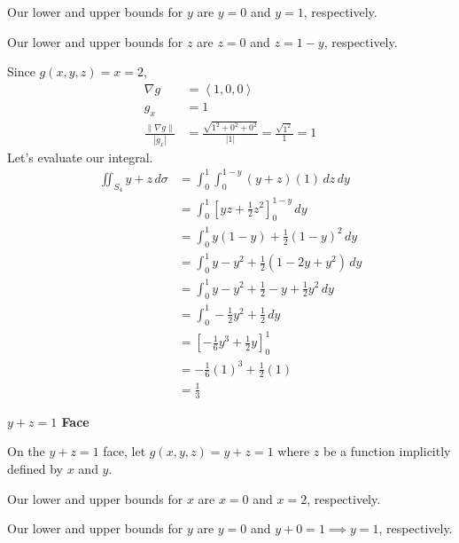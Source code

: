 \documentclass{article}
\newcommand{\lrp}[1]{\left( #1 \right)}
\newcommand{\lra}[1]{\left\langle #1 \right\rangle}
\newcommand{\lrb}[1]{\left[ #1 \right]}
\newcommand{\norm}[1]{\left\lVert #1 \right\rVert}
\begin{document}
Our lower and upper bounds for $y$ are $y=0$ and $y=1$, respectively.

Our lower and upper bounds for $z$ are $z=0$ and $z=1-y$, respectively.

Since $g(x,y,z)=x=2$,
\begin{align*}
    \nabla g &=\lra{1,0,0}\\
    g_x&=1\\
    \frac{\norm{\nabla g}}{\left|g_x\right|}&=\frac{\sqrt{1^2+0^2+0^2}}{\left|1\right|}=\frac{\sqrt{1^2}}{1}=1
\end{align*}
Let's evaluate our integral.
\begin{align*}
      \iint_{S_4} y+z\,d\sigma&=\int_0^1\int_0^{1-y}\lrp{y+z}\lrp{1}\,dz\,dy\\
    &=\int_0^1\lrb{yz+\frac{1}{2}z^2}_0^{1-y}\,dy\\
    &=\int_0^1 y(1-y)+\frac{1}{2}(1-y)^2\,dy\\
    &=\int_0^1 y-y^2 +\frac{1}{2}\lrp{1-2y+y^2}\,dy\\
    &=\int_0^1 y-y^2+\frac{1}{2}-y+\frac{1}{2}y^2\,dy\\
    &=\int_0^1 -\frac{1}{2}y^2 +\frac{1}{2}\,dy\\
    &=\lrb{-\frac{1}{6}y^3+\frac{1}{2}y}_0^1\\
    &=-\frac{1}{6}(1)^3+\frac{1}{2}(1)\\
    &=\frac{1}{3}
\end{align*}

{}\textbf{$y+z=1$ Face}

On the $y+z=1$ face, let $g(x,y,z)=y+z=1$ where $z$ be a function implicitly defined by $x$ and $y$. 

Our lower and upper bounds for $x$ are $x=0$ and $x=2$, respectively.

Our lower and upper bounds for $y$ are $y=0$ and $y+0=1\implies y=1$, respectively.
\end{document}
